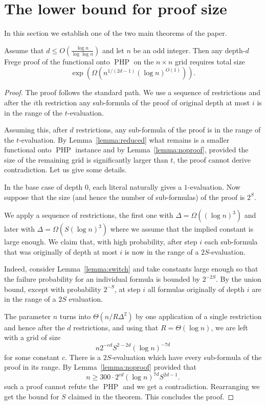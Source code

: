 \documentclass{theoretics}
\DeclareMathOperator{\PHP}{PHP}
\begin{document}
\section{The lower bound for proof size}\label{sec:size}

In this section we establish one of the two main theorems
of the paper.

\begin{theorem}\label{thm:size}
Assume that $d \leq O(\frac{\log n}{\log {\log n}})$ and let
$n$ be an odd integer. Then any depth-$d$ Frege proof of
the functional onto $\PHP$ on the $n \times n$ grid requires total size
$$
\exp (\Omega (n^{1/(2d-1)} (\log n)^{O(1)})).
$$
\end{theorem}

\begin{proof}
The proof follows the standard path.  We use
a sequence of restrictions and after the $i$th
restriction any sub-formula of the proof
of original depth at most $i$ is in the range of the $t$-evaluation.

Assuming this, after $d$ restrictions, any sub-formula
of the proof is in the range of the $t$-evaluation.
By Lemma~\ref{lemma:reduced} what remains is a smaller
functional onto $\PHP$ instance and
by Lemma~\ref{lemma:noproof}, provided the
size of the remaining grid is significantly larger than
$t$, the proof cannot derive contradiction.  Let us give
some details.

In the base case of depth $0$, each literal naturally gives
a $1$-evaluation.  Now
suppose that the size (and hence the number of sub-formulas)
of the proof is $2^S$.

We apply a sequence of restrictions, the first
one with $\Delta= \Omega ((\log n) ^3)$ and later with
$\Delta= \Omega (S(\log n) ^3)$ where we assume that
the implied constant is large enough.  We claim that,
with high probability, after step $i$ each sub-formula that was originally
of depth at most $i$ is now in the range of a $2S$-evaluation.

Indeed, consider Lemma~\ref{lemma:switch} and take
constants large enough so that the failure probability for
an individual formula is bounded by $2^{-2S}$.  By the
union bound, except with probability $2^{-S}$, at step
$i$ all formulas originally of depth $i$ are
in the range of a $2S$ evaluation.

The parameter $n$ turns into $\Theta (n/R\Delta^2)$ by one
application of a single restriction and
hence after the $d$ restrictions, and using
that $R=\Theta (\log n)$,  we are left with
a grid of size
$$
n 2^{-cd} S^{2-2d} (\log n)^{-7d}
$$
for some constant $c$.  There is 
a $2S$-evaluation which have every sub-formula
of the proof in its range.  By Lemma~\ref{lemma:noproof}
provided that 
$$
n \geq 300 \cdot 2^{cd} (\log n)^{7d} S^{2d-1}.
$$
such a proof cannot refute the $\PHP$ and we get
a contradiction.  Rearranging we get the bound for $S$
claimed in the theorem.
This concludes the proof.
\end{proof}
\end{document}

